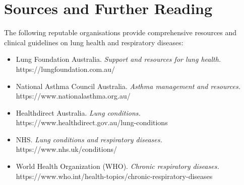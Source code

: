 \section*{Sources and Further Reading}
The following reputable organisations provide comprehensive resources and clinical guidelines on lung health and respiratory diseases:
\begin{itemize}
    \item Lung Foundation Australia. \textit{Support and resources for lung health.} https://lungfoundation.com.au/
    \item National Asthma Council Australia. \textit{Asthma management and resources.} https://www.nationalasthma.org.au/
    \item Healthdirect Australia. \textit{Lung conditions.} https://www.healthdirect.gov.au/lung-conditions
    \item NHS. \textit{Lung conditions and respiratory diseases.} https://www.nhs.uk/conditions/
    \item World Health Organization (WHO). \textit{Chronic respiratory diseases.} https://www.who.int/health-topics/chronic-respiratory-diseases
\end{itemize}
